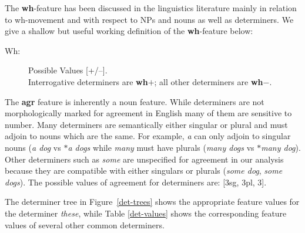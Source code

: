 The {\bf wh}-feature has been discussed in the linguistics literature mainly in relation to wh-movement and with respect to NPs and nouns as well as determiners. We give a shallow but useful working definition of the {\bf wh}-feature below: 
 
\begin{description} 
 
\item[Wh:]  Possible Values [+/--]. \\ 
Interrogative determiners are {\bf wh$+$}; all other determiners are 
{\bf wh$-$}. 
\end{description} 
 
The {\bf agr} feature is inherently a noun feature.  While determiners 
are not morphologically marked for agreement in English many of them 
are sensitive to number.  Many determiners are semantically either 
singular or plural and must adjoin to nouns which are the same. For 
example, {\it a\/} can only adjoin to singular nouns ({\it a dog\/} vs 
{\it $\ast$a dogs\/} while {\it many\/} must have plurals ({\it many dogs\/} vs {\it $\ast$many dog\/}). Other determiners such as {\it some} are 
unspecified for agreement in our analysis because they are compatible 
with either singulars or plurals ({\it some dog}, {\it some dogs}). The possible values of agreement for determiners are: [3sg, 3pl, 3]. 
 
 
 
 
The determiner tree in Figure~\ref{det-trees} shows the appropriate 
feature values for the determiner {\it these}, while Table \ref{det-values} 
shows the corresponding feature values of several other common determiners. 
 
